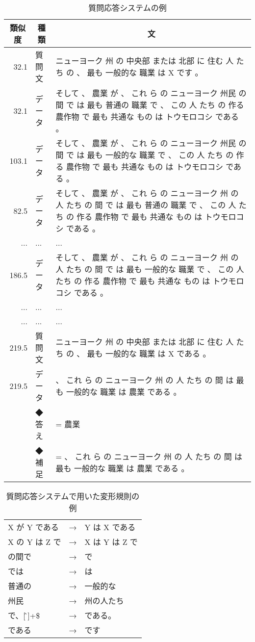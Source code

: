 \begin{table*}[t]
  \begin{center}
    \leavevmode
    \caption{質問応答システムの例}
    \label{tab:qa_result}
\small
\begin{tabular}{|r|l|p{10cm}|}\hline
\multicolumn{1}{|c|}{類似度} & \multicolumn{1}{|c|}{種類} & \multicolumn{1}{|c|}{文}\\\hline
32.1 & 質問文 &  ニューヨーク 州 の 中央部 または 北部 に 住む 人 たち の 、 最も 一般的な 職業 は X です 。 \\
32.1 & データ & そして 、 農業 が 、 これ ら の ニューヨーク 州民 の 間 で は 最も 普通の 職業 で 、 この 人 たち の 作る 農作物 で 最も 共通な もの は トウモロコシ である 。 \\\hline
103.1 & データ & そして 、 農業 が 、 これ ら の ニューヨーク 州民 の 間 で は 最も 一般的な 職業 で 、 この 人 たち の 作る 農作物 で 最も 共通な もの は トウモロコシ である 。 \\
82.5& データ & そして 、 農業 が 、 これ ら の ニューヨーク 州 の 人 たち の 間 で は 最も 普通の 職業 で 、 この 人 たち の 作る 農作物 で 最も 共通な もの は トウモロコシ である 。 \\
... & ... & ...\\\hline
186.5 & データ & そして 、 農業 が 、 これ ら の ニューヨーク 州 の 人 たち の 間 で は 最も 一般的な 職業 で 、 この 人 たち の 作る 農作物 で 最も 共通な もの は トウモロコシ である 。 \\\
... & ... & ...\\\hline
... & ... & ...\\\hline
219.5 & 質問文 & ニューヨーク 州 の 中央部 または 北部 に 住む 人 たち の 、 最も 一般的な 職業 は X である 。 \\
219.5 & データ & 、 これ ら の ニューヨーク 州 の 人 たち の 間 は 最も 一般的な 職業 は 農業 である 。 \\\hline
& ◆答え & = 農業\\
& ◆補足 & = 、 これ ら の ニューヨーク 州 の 人 たち の 間 は 最も 一般的な 職業 は 農業 である 。 \\\hline
\end{tabular}
\end{center}
\end{table*}

\begin{table}[t]
  \begin{center}
    \leavevmode
    \caption{質問応答システムで用いた変形規則の例}
    \label{tab:hitode_kisoku}
\begin{tabular}[h]{|lll|}\hline
X が Y である &→& Y は X である\\
X の Y は Z で &→& X は Y は Z で\\
の間で &→& で\\
では &→& は\\
普通の &→& 一般的な\\
州民 &→& 州の人たち\\
で、[\^、]+\$ &→& である。\\
である &→& です\\\hline
\end{tabular}
  \end{center}
\end{table}

